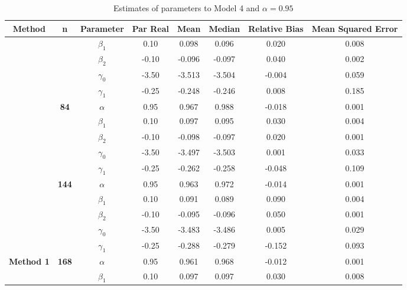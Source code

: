 \begin{table}[h]

\caption{\label{tab:Est_model_4_Alpha0.95}Estimates of parameters to Model 4 and $\alpha=0.95$}
\centering
\begin{tabular}[t]{>{}c>{}ccccccc}
\toprule
Method & n & Parameter & Par Real & Mean & Median & Relative Bias & Mean Squared Error\\
\midrule
 &  & $\beta_1$ & 0.10 & 0.098 & 0.096 & 0.020 & 0.008\\

 &  & $\beta_2$ & -0.10 & -0.096 & -0.097 & 0.040 & 0.002\\

 &  & $\gamma_0$ & -3.50 & -3.513 & -3.504 & -0.004 & 0.059\\

 &  & $\gamma_1$ & -0.25 & -0.248 & -0.246 & 0.008 & 0.185\\

 & \multirow{-5}{*}{\centering\arraybackslash \textbf{84}} & $\alpha$ & 0.95 & 0.967 & 0.988 & -0.018 & 0.001\\

 &  & $\beta_1$ & 0.10 & 0.097 & 0.095 & 0.030 & 0.004\\

 &  & $\beta_2$ & -0.10 & -0.098 & -0.097 & 0.020 & 0.001\\

 &  & $\gamma_0$ & -3.50 & -3.497 & -3.503 & 0.001 & 0.033\\

 &  & $\gamma_1$ & -0.25 & -0.262 & -0.258 & -0.048 & 0.109\\

 & \multirow{-5}{*}{\centering\arraybackslash \textbf{144}} & $\alpha$ & 0.95 & 0.963 & 0.972 & -0.014 & 0.001\\

 &  & $\beta_1$ & 0.10 & 0.091 & 0.089 & 0.090 & 0.004\\

 &  & $\beta_2$ & -0.10 & -0.095 & -0.096 & 0.050 & 0.001\\

 &  & $\gamma_0$ & -3.50 & -3.483 & -3.486 & 0.005 & 0.029\\

 &  & $\gamma_1$ & -0.25 & -0.288 & -0.279 & -0.152 & 0.093\\

\multirow{-15}{*}{\centering\arraybackslash \textbf{Method 1}} & \multirow{-5}{*}{\centering\arraybackslash \textbf{168}} & $\alpha$ & 0.95 & 0.961 & 0.968 & -0.012 & 0.001\\
\cmidrule{1-8}
 &  & $\beta_1$ & 0.10 & 0.097 & 0.097 & 0.030 & 0.008\\


\end{tabular}
\end{table}
